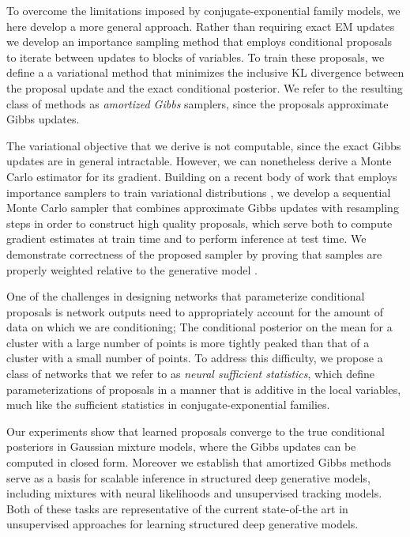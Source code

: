 \documentclass{article}
\theoremstyle{definition}
\begin{document}
To overcome the limitations imposed by conjugate-exponential family models, we here develop a more general approach. Rather than requiring exact EM updates we develop an importance sampling method that employs conditional proposals to iterate between updates to blocks of variables. To train these proposals, we define a a variational method that minimizes the inclusive KL divergence between the proposal update and the exact conditional posterior. We refer to the resulting class of methods as \emph{amortized Gibbs} samplers, since the proposals approximate Gibbs updates.

The variational objective that we derive is not computable, since the exact Gibbs updates are in general intractable. However, we can nonetheless derive a Monte Carlo estimator for its gradient. Building on a recent body of work that employs importance samplers to train variational distributions \cite{burda2016importance,le2018auto-encoding,maddison2017filtering,naesseth2018variational}, we develop a sequential Monte Carlo sampler \cite{delmoral2006sequential} that combines approximate Gibbs updates with resampling steps in order to construct high quality proposals, which serve both to compute gradient estimates at train time and to perform inference at test time. We demonstrate correctness of the proposed sampler by  proving that samples are properly weighted relative to the generative model \cite{naesseth2015nested}.

One of the challenges in designing networks that parameterize conditional proposals is network outputs need to appropriately account for the amount of data on which we are conditioning; The conditional posterior on the mean for a cluster with a large number of points is more tightly peaked than that of a cluster with a small number of points. To address this difficulty, we propose a class of networks that we refer to as \emph{neural sufficient statistics}, which define parameterizations of proposals in a manner that is additive in the local variables, much like the sufficient statistics in conjugate-exponential families.

Our experiments show that learned proposals converge to the true conditional posteriors in Gaussian mixture models, where the Gibbs updates can be computed in closed form. Moreover we establish that amortized Gibbs methods serve as a basis for scalable inference in structured deep generative models, including mixtures with neural likelihoods and unsupervised tracking models. Both of these tasks are representative of the current state-of-the art in unsupervised approaches for learning structured deep generative models.
\end{document}
